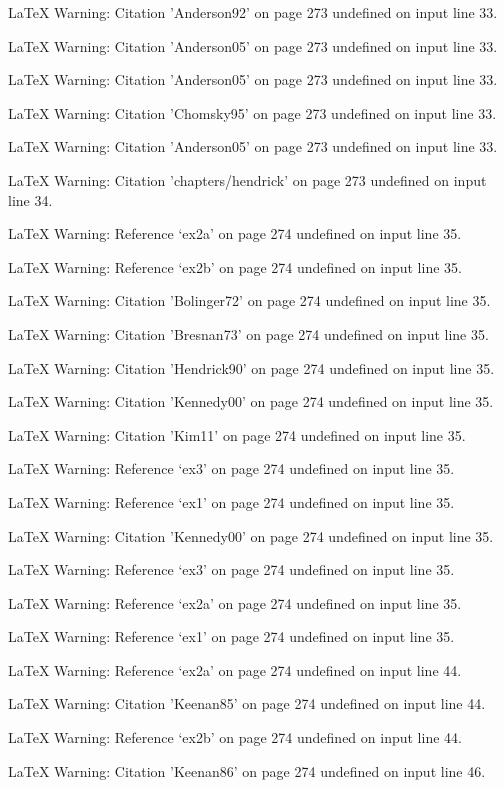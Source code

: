 LaTeX Warning: Citation 'Anderson92' on page 273 undefined on input line 33.


LaTeX Warning: Citation 'Anderson05' on page 273 undefined on input line 33.


LaTeX Warning: Citation 'Anderson05' on page 273 undefined on input line 33.


LaTeX Warning: Citation 'Chomsky95' on page 273 undefined on input line 33.


LaTeX Warning: Citation 'Anderson05' on page 273 undefined on input line 33.


LaTeX Warning: Citation 'chapters/hendrick' on page 273 undefined on input line 34.


LaTeX Warning: Reference `ex2a' on page 274 undefined on input line 35.


LaTeX Warning: Reference `ex2b' on page 274 undefined on input line 35.


LaTeX Warning: Citation 'Bolinger72' on page 274 undefined on input line 35.


LaTeX Warning: Citation 'Bresnan73' on page 274 undefined on input line 35.


LaTeX Warning: Citation 'Hendrick90' on page 274 undefined on input line 35.


LaTeX Warning: Citation 'Kennedy00' on page 274 undefined on input line 35.


LaTeX Warning: Citation 'Kim11' on page 274 undefined on input line 35.


LaTeX Warning: Reference `ex3' on page 274 undefined on input line 35.


LaTeX Warning: Reference `ex1' on page 274 undefined on input line 35.


LaTeX Warning: Citation 'Kennedy00' on page 274 undefined on input line 35.


LaTeX Warning: Reference `ex3' on page 274 undefined on input line 35.


LaTeX Warning: Reference `ex2a' on page 274 undefined on input line 35.


LaTeX Warning: Reference `ex1' on page 274 undefined on input line 35.


LaTeX Warning: Reference `ex2a' on page 274 undefined on input line 44.


LaTeX Warning: Citation 'Keenan85' on page 274 undefined on input line 44.


LaTeX Warning: Reference `ex2b' on page 274 undefined on input line 44.


LaTeX Warning: Citation 'Keenan86' on page 274 undefined on input line 46.


